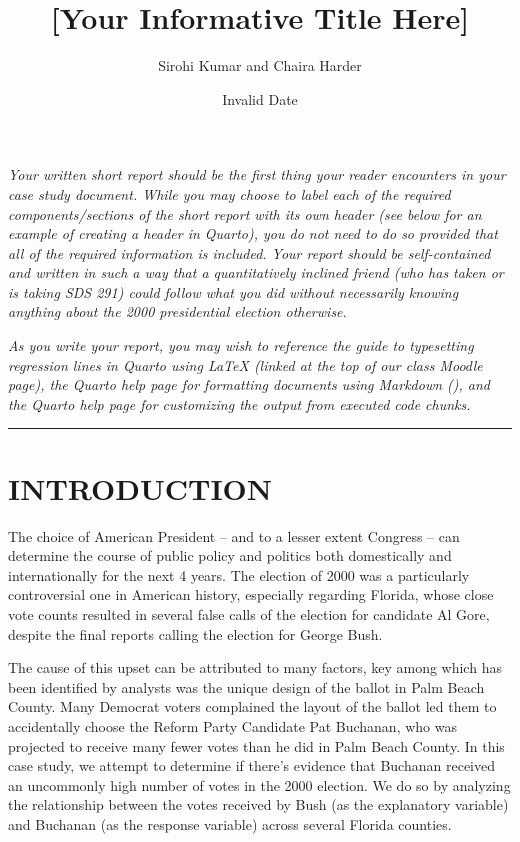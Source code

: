 \documentclass[
  letterpaper,
  DIV=11,
  numbers=noendperiod]{scrartcl}
\title{{[}Your Informative Title Here{]}}
\author{Sirohi Kumar and Chaira Harder}
\date{Invalid Date}
\begin{document}
\maketitle
\ifdefined\Shaded\renewenvironment{Shaded}{\begin{tcolorbox}[breakable, interior hidden, sharp corners, enhanced, frame hidden, borderline west={3pt}{0pt}{shadecolor}, boxrule=0pt]}{\end{tcolorbox}}\fi

\emph{Your written short report should be the first thing your reader
encounters in your case study document. While you may choose to label
each of the required components/sections of the short report with its
own header (see below for an example of creating a header in Quarto),
you do not need to do so provided that all of the required information
is included. Your report should be self-contained and written in such a
way that a quantitatively inclined friend (who has taken or is taking
SDS 291) could follow what you did without necessarily knowing anything
about the 2000 presidential election otherwise.}

\emph{As you write your report, you may wish to reference the guide to
typesetting regression lines in Quarto using LaTeX (linked at the top of
our class Moodle page), the Quarto help page for formatting documents
using Markdown (), and the Quarto help page for customizing the output
from executed code chunks.}

\begin{center}\rule{0.5\linewidth}{0.5pt}\end{center}

\hypertarget{introduction}{%
\section{INTRODUCTION}\label{introduction}}

The choice of American President -- and to a lesser extent Congress --
can determine the course of public policy and politics both domestically
and internationally for the next 4 years. The election of 2000 was a
particularly controversial one in American history, especially regarding
Florida, whose close vote counts resulted in several false calls of the
election for candidate Al Gore, despite the final reports calling the
election for George Bush.

The cause of this upset can be attributed to many factors, key among
which has been identified by analysts was the unique design of the
ballot in Palm Beach County. Many Democrat voters complained the layout
of the ballot led them to accidentally choose the Reform Party Candidate
Pat Buchanan, who was projected to receive many fewer votes than he did
in Palm Beach County. In this case study, we attempt to determine if
there's evidence that Buchanan received an uncommonly high number of
votes in the 2000 election. We do so by analyzing the relationship
between the votes received by Bush (as the explanatory variable) and
Buchanan (as the response variable) across several Florida counties.
\end{document}
